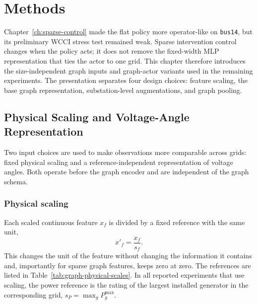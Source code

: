 \chapter{Methods}
\label{ch:methods}


Chapter~\ref{ch:sparse-control} made the flat policy more operator-like on
\texttt{bus14}, but its preliminary WCCI stress test remained weak. Sparse
intervention control changes when the policy acts; it does not remove the
fixed-width MLP representation that ties the actor to one grid. This chapter
therefore introduces the size-independent graph inputs and graph-actor variants
used in the remaining experiments. The presentation separates four design
choices: feature scaling, the base graph representation, substation-level
augmentations, and graph pooling.

\section{Physical Scaling and Voltage-Angle Representation}
\label{subsec:graph-feature-normalization}

Two input choices are used to make observations more comparable across grids:
fixed physical scaling and a reference-independent representation of voltage
angles. Both operate before the graph encoder and are independent of the graph
schema.

\subsection{Physical scaling}

Each scaled continuous feature $x_f$ is divided by a fixed reference with the
same unit,
\[
  x'_f = \frac{x_f}{s_f}.
\]
This changes the unit of the feature without changing the information it
contains and, importantly for sparse graph features, keeps zero at zero. The
references are listed in Table~\ref{tab:graph-physical-scales}. In all reported
experiments that use scaling, the power reference is the rating of the largest
installed generator in the corresponding grid,
$s_P=\max_g P_g^{\max}$.

